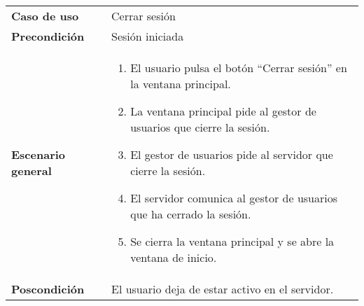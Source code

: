 {\footnotesize
\begin{tabularx}{0.95\textwidth}{p{}|X}

\textbf{Caso de uso} & Cerrar sesión \\

\textbf{Precondición} & Sesión iniciada \\

\textbf{Escenario general} & \begin{enumerate}
\item El usuario pulsa el botón ``Cerrar sesión'' en la ventana principal.
\item La ventana principal pide al gestor de usuarios que cierre la sesión.
\item El gestor de usuarios pide al servidor que cierre la sesión.
\item El servidor comunica al gestor de usuarios que ha cerrado la sesión.
\item Se cierra la ventana principal y se abre la ventana de inicio.
\end{enumerate} \\

\textbf{Poscondición} & El usuario deja de estar activo en el servidor.

\end{tabularx}
}

